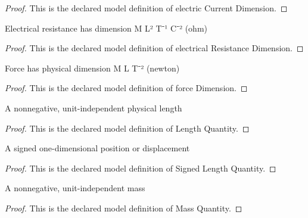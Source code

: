 \begin{proof}
  This is the declared model definition of electric Current Dimension.
\end{proof}
\begin{definition}
  \label{def:physics:phyx-mini-0977:phyxminiproblems-problemphyxmini0977-electricalresistancedimension}
  Electrical resistance has dimension M L² T⁻¹ C⁻² (ohm)
\end{definition}
\begin{proof}
  This is the declared model definition of electrical Resistance Dimension.
\end{proof}
\begin{definition}
  \label{def:physics:phyx-mini-0977:phyxminiproblems-problemphyxmini0977-forcedimension}
  Force has physical dimension M L T⁻² (newton)
\end{definition}
\begin{proof}
  This is the declared model definition of force Dimension.
\end{proof}
\begin{definition}
  \label{def:physics:phyx-mini-0977:phyxminiproblems-problemphyxmini0977-lengthquantity}
  A nonnegative, unit-independent physical length
\end{definition}
\begin{proof}
  This is the declared model definition of Length Quantity.
\end{proof}
\begin{definition}
  \label{def:physics:phyx-mini-0977:phyxminiproblems-problemphyxmini0977-signedlengthquantity}
  A signed one-dimensional position or displacement
\end{definition}
\begin{proof}
  This is the declared model definition of Signed Length Quantity.
\end{proof}
\begin{definition}
  \label{def:physics:phyx-mini-0977:phyxminiproblems-problemphyxmini0977-massquantity}
  A nonnegative, unit-independent mass
\end{definition}
\begin{proof}
  This is the declared model definition of Mass Quantity.
\end{proof}
